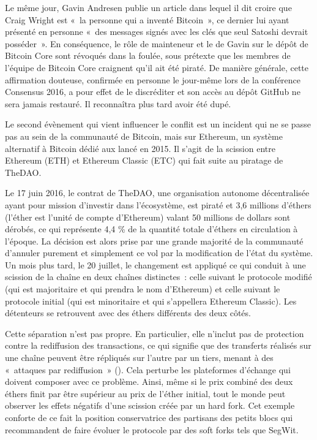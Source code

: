 Le même jour, Gavin Andresen publie un article dans lequel il dit croire que Craig Wright est «~la personne qui a inventé Bitcoin~», ce dernier lui ayant présenté en personne «~des messages signés avec les clés que seul Satoshi devrait posséder~». En conséquence, le rôle de mainteneur et le  de Gavin sur le dépôt de Bitcoin Core sont révoqués dans la foulée, sous prétexte que les membres de l'équipe de Bitcoin Core craignent qu'il ait été piraté. De manière générale, cette affirmation douteuse, confirmée en personne le jour-même lors de la conférence Consensus 2016, a pour effet de le discréditer et son accès au dépôt GitHub ne sera jamais restauré. Il reconnaîtra plus tard avoir été dupé.

Le second évènement qui vient influencer le conflit est un incident qui ne se passe pas au sein de la communauté de Bitcoin, mais sur Ethereum, un système alternatif à Bitcoin dédié aux  lancé en 2015. Il s'agit de la scission entre Ethereum (ETH) et Ethereum Classic (ETC) qui fait suite au piratage de TheDAO. %

Le 17 juin 2016, le contrat de TheDAO, une organisation autonome décentralisée ayant pour mission d'investir dans l'écosystème, est piraté et 3,6 millions d'éthers (l'éther est l'unité de compte d'Ethereum) valant 50 millions de dollars sont dérobés, ce qui représente 4,4 \% de la quantité totale d'éthers en circulation à l'époque. La décision est alors prise par une grande majorité de la communauté d'annuler purement et simplement ce vol par la modification de l'état du système. Un mois plus tard, le 20 juillet, le changement est appliqué ce qui conduit à une scission de la chaîne en deux chaînes distinctes~: celle suivant le protocole modifié (qui est majoritaire et qui prendra le nom d'Ethereum) et celle suivant le protocole initial (qui est minoritaire et qui s'appellera Ethereum Classic). Les détenteurs se retrouvent avec des éthers différents des deux côtés.

Cette séparation n'est pas propre. En particulier, elle n'inclut pas de protection contre la rediffusion des transactions, ce qui signifie que des transferts réalisés sur une chaîne peuvent être répliqués sur l'autre par un tiers, menant à des «~attaques par rediffusion~» (). Cela perturbe les plateformes d'échange qui doivent composer avec ce problème. Ainsi, même si le prix combiné des deux éthers finit par être supérieur au prix de l'éther initial, tout le monde peut observer les effets négatifs d'une scission créée par un hard fork. Cet exemple conforte de ce fait la position conservatrice des partisans des petits blocs qui recommandent de faire évoluer le protocole par des soft forks tels que SegWit.

